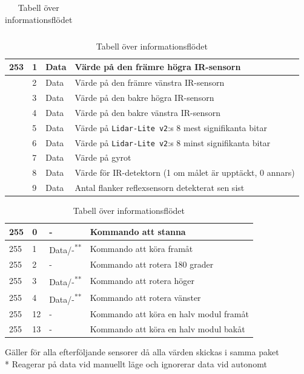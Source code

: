 \documentclass[11pt]{article}
\begin{document}
\begin{flushleft}
\begin{table}[H]
\begin{tabular}{|p{6em}|p{1em}|p{6em}|p{22em}|}
\end{tabular}

\begin{tabular}{|p{6em}|p{1em}|p{6em}|p{22em}|} \hline
253\text{*}  & 1 & Data & Värde på den främre högra IR-sensorn \\ \hline
 & 2 & Data & Värde på den främre vänstra IR-sensorn \\ \hline
 & 3 & Data & Värde på den bakre högra IR-sensorn \\ \hline
 & 4 & Data & Värde på den bakre vänstra IR-sensorn \\ \hline
 & 5 & Data &  Värde på \verb+Lidar-Lite v2+:s 8 mest signifikanta bitar \\ \hline
 & 6 & Data &  Värde på \verb+Lidar-Lite v2+:s 8 minst signifikanta bitar \\ \hline
 & 7 & Data & Värde på gyrot \\ \hline
 & 8 & Data & Värde för IR-detektorn (1 om målet är upptäckt, 0 annars) \\ \hline
 & 9 & Data & Antal flanker reflexsensorn detekterat sen sist\\ \hline
\end{tabular}

\begin{tabular}{|p{6em}|p{1em}|p{6em}|p{22em}|} \hline

255 & 0 & - & Kommando att stanna \\ \hline
255 & 1 & Data/-\textsuperscript{**}   & Kommando att köra framåt \\ \hline
255 & 2 & - & Kommando att rotera 180 grader\\ \hline
255 & 3 & Data/-\textsuperscript{**}    & Kommando att rotera höger \\ \hline
255 & 4 & Data/-\textsuperscript{**}    & Kommando att rotera vänster \\ \hline
255 & 12 & - & Kommando att köra en halv modul framåt\\ \hline
255 & 13 & - & Kommando att köra en halv modul bakåt \\ \hline
\end{tabular}

\text{*} Gäller för alla efterföljande sensorer då alla värden skickas i samma paket \\*
\text{**} Reagerar på data vid manuellt läge och ignorerar data vid autonomt

\caption{Tabell över informationsflödet} \label{tab}
\end{table}


\end{flushleft}
\end{document}

